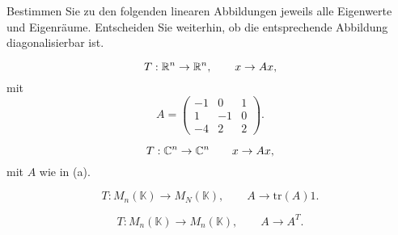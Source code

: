 \begin{Problem}
	Bestimmen Sie zu den folgenden linearen Abbildungen jeweils alle Eigenwerte und Eigenräume. Entscheiden Sie weiterhin, ob die entsprechende Abbildung diagonalisierbar ist.
	\begin{parts}
	\item 
		\[
		T:\mathbb{R}^n\to \mathbb{R}^n,\qquad x\to Ax,\] mit
		\[
			A=\begin{pmatrix} -1 & 0 & 1 \\ 1 & -1 & 0 \\ -4 & 2 & 2 \end{pmatrix} 
		.\] 
	\item 
		\[
		T:\mathbb{C}^n\to \mathbb{C}^n\qquad x\to Ax,\] mit $A$ wie in (a).
	\item 
		\[
			T:M_n(\mathbb{K})\to M_N(\mathbb{K}),\qquad A\to \text{tr}(A)1
		.\] 
	\item
		 \[
			 T: M_n(\mathbb{K})\to M_n(\mathbb{K}),\qquad A\to A^T
		.\] 
	\end{parts}
\end{Problem}

